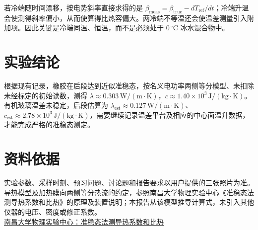 \documentclass[UTF8,a4paper,11pt]{ctexart}
\newcommand{\unit}[1]{\,\mathrm{#1}}
\begin{document}
若冷端随时间漂移，按电势斜率直接求得的是 $\beta_{\mathrm{meas}}=\beta_{\mathrm{true}}-dT_{\mathrm{ref}}/dt$；冷端升温会使测得斜率偏小，从而使算得比热容偏大。两冷端不等温还会使温差测量引入附加项。因此关键是冷端同温、恒温，而不是必须处于 $0\,{}^\circ\mathrm C$ 冰水混合物中。

\section{实验结论}
根据现有记录，橡胶在后段达到近似准稳态，按名义电功率两侧等分模型、未扣除未经标定的初始读数，测得 $\lambda\approx0.303\unit{W/(m\cdot K)}$，$c\approx1.40\times10^3\unit{J/(kg\cdot K)}$。有机玻璃温差未稳定，后段估算为 $\lambda_{\mathrm{est}}\approx0.127\unit{W/(m\cdot K)}$、$c_{\mathrm{est}}\approx2.78\times10^3\unit{J/(kg\cdot K)}$，需要继续记录温差平台及相应的中心面温升数据，才能完成严格的准稳态测定。

\section*{资料依据}
实验参数、采样时刻、预习问题、讨论题和报告要求以用户提供的三张照片为准。导热模型及加热膜向两侧等分热流的约定，参照南昌大学物理实验中心《准稳态法测导热系数和比热》的原理及装置说明；本报告从该模型推导计算式，未引入其他仪器的电压、密度或修正系数。\\
\href{https://wlsyzx.ncu.edu.cn/docs/2023-07/151e7eb1bc0f44c6a7972251a086caaa.pdf}{南昌大学物理实验中心：准稳态法测导热系数和比热}
\end{document}
